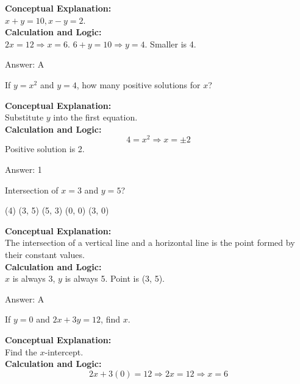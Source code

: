 \documentclass[11pt,paper=a4,answers]{exam}
\begin{document}
\begin{questions}
\begin{solution}
\textbf{Conceptual Explanation:} \\
$x+y=10, x-y=2$.
\\[10pt]
\textbf{Calculation and Logic:} \\
$2x=12 \Rightarrow x=6$. $6+y=10 \Rightarrow y=4$. Smaller is 4.

\vspace{15pt}
Answer: \colorbox{yellow!100}{A}
\end{solution}

\question
If $y = x^2$ and $y = 4$, how many positive solutions for $x$?

\begin{solution}
\textbf{Conceptual Explanation:} \\
Substitute $y$ into the first equation.
\\[10pt]
\textbf{Calculation and Logic:} \\
\[4 = x^2 \Rightarrow x = \pm 2\]
Positive solution is 2.

\vspace{15pt}
Answer: \colorbox{yellow!100}{1}
\end{solution}

\question
Intersection of $x=3$ and $y=5$?
\begin{tasks}(4)
    \task (3, 5)
    \task (5, 3)
    \task (0, 0)
    \task (3, 0)
\end{tasks}

\begin{solution}
\textbf{Conceptual Explanation:} \\
The intersection of a vertical line and a horizontal line is the point formed by their constant values.
\\[10pt]
\textbf{Calculation and Logic:} \\
$x$ is always 3, $y$ is always 5. Point is (3, 5).

\vspace{15pt}
Answer: \colorbox{yellow!100}{A}
\end{solution}

\question
If $y = 0$ and $2x + 3y = 12$, find $x$.

\begin{solution}
\textbf{Conceptual Explanation:} \\
Find the $x$-intercept.
\\[10pt]
\textbf{Calculation and Logic:} \\
\[2x + 3(0) = 12 \Rightarrow 2x = 12 \Rightarrow x = 6\]


\end{solution}
\end{questions}
\end{document}
